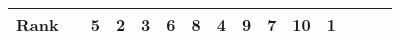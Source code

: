 \begin{tabular}{ll|rrrrrrrrr|rrrr}


  


  
  Rank & &
  5 & 2 & 3 & 6 & 8 & 4 & 9 & 7 & 10 & 1 &  &  &  \\\hline\hline
\end{tabular}


